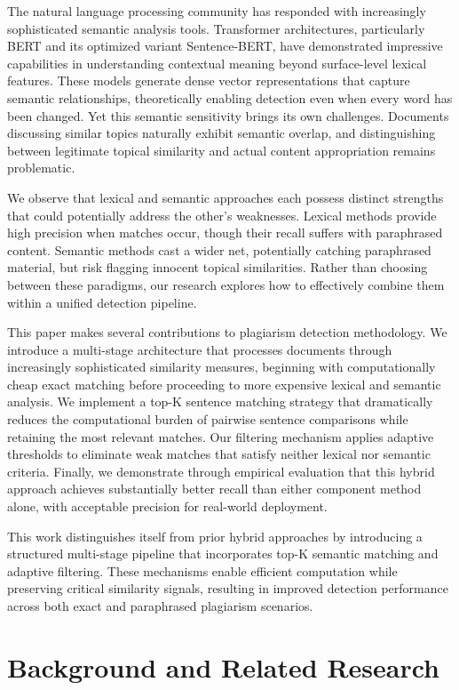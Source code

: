 \documentclass[conference]{IEEEtran}
\begin{document}
The natural language processing community has responded with increasingly sophisticated semantic analysis tools. Transformer architectures, particularly BERT and its optimized variant Sentence-BERT, have demonstrated impressive capabilities in understanding contextual meaning beyond surface-level lexical features. These models generate dense vector representations that capture semantic relationships, theoretically enabling detection even when every word has been changed. Yet this semantic sensitivity brings its own challenges. Documents discussing similar topics naturally exhibit semantic overlap, and distinguishing between legitimate topical similarity and actual content appropriation remains problematic.

We observe that lexical and semantic approaches each possess distinct strengths that could potentially address the other's weaknesses. Lexical methods provide high precision when matches occur, though their recall suffers with paraphrased content. Semantic methods cast a wider net, potentially catching paraphrased material, but risk flagging innocent topical similarities. Rather than choosing between these paradigms, our research explores how to effectively combine them within a unified detection pipeline.

This paper makes several contributions to plagiarism detection methodology. We introduce a multi-stage architecture that processes documents through increasingly sophisticated similarity measures, beginning with computationally cheap exact matching before proceeding to more expensive lexical and semantic analysis. We implement a top-K sentence matching strategy that dramatically reduces the computational burden of pairwise sentence comparisons while retaining the most relevant matches. Our filtering mechanism applies adaptive thresholds to eliminate weak matches that satisfy neither lexical nor semantic criteria. Finally, we demonstrate through empirical evaluation that this hybrid approach achieves substantially better recall than either component method alone, with acceptable precision for real-world deployment.

This work distinguishes itself from prior hybrid approaches by introducing a structured multi-stage pipeline that incorporates top-K semantic matching and adaptive filtering. These mechanisms enable efficient computation while preserving critical similarity signals, resulting in improved detection performance across both exact and paraphrased plagiarism scenarios.
\section{Background and Related Research}
\end{document}
